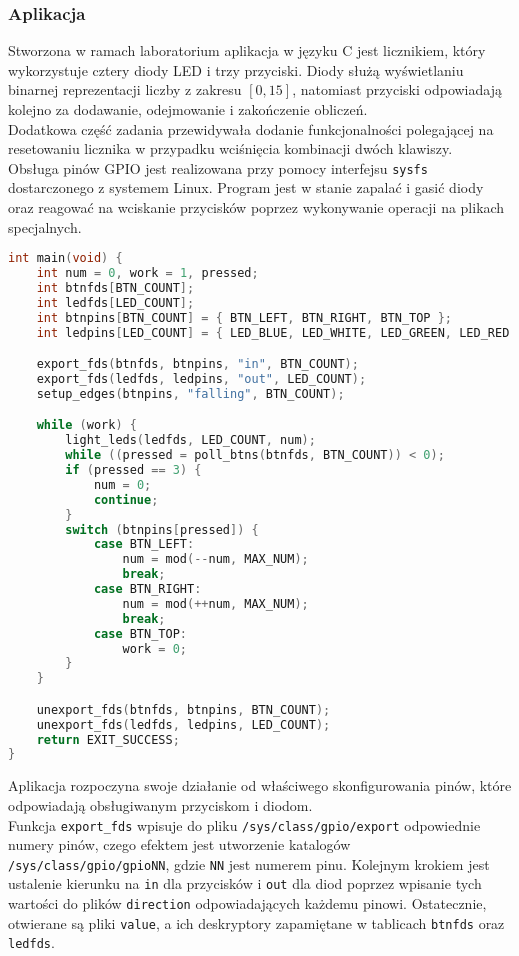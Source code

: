 \documentclass[10pt,a4paper]{article}
\begin{document}
\subsubsection{Aplikacja}
Stworzona w ramach laboratorium aplikacja w języku C jest licznikiem, który wykorzystuje cztery diody LED i trzy przyciski. Diody służą wyświetlaniu binarnej reprezentacji liczby z zakresu $[0,15]$, natomiast przyciski odpowiadają kolejno za dodawanie, odejmowanie i zakończenie obliczeń.\\[\baselineskip]
Dodatkowa część zadania przewidywała dodanie funkcjonalności polegającej na resetowaniu licznika w przypadku wciśnięcia kombinacji dwóch klawiszy.\\[\baselineskip]
Obsługa pinów GPIO jest realizowana przy pomocy interfejsu \texttt{sysfs} dostarczonego z systemem Linux. Program jest w stanie zapalać i gasić diody oraz reagować na wciskanie przycisków poprzez wykonywanie operacji na plikach specjalnych.
\begin{lstlisting}[style=bash, language=c, caption={Funkcja main w pliku counter.c}]
int main(void) {
	int num = 0, work = 1, pressed;
	int btnfds[BTN_COUNT];
	int ledfds[LED_COUNT];
	int btnpins[BTN_COUNT] = { BTN_LEFT, BTN_RIGHT, BTN_TOP };
	int ledpins[LED_COUNT] = { LED_BLUE, LED_WHITE, LED_GREEN, LED_RED };

	export_fds(btnfds, btnpins, "in", BTN_COUNT);
	export_fds(ledfds, ledpins, "out", LED_COUNT);
	setup_edges(btnpins, "falling", BTN_COUNT);

	while (work) {
		light_leds(ledfds, LED_COUNT, num);
		while ((pressed = poll_btns(btnfds, BTN_COUNT)) < 0);
		if (pressed == 3) {
			num = 0;
			continue;
		}
		switch (btnpins[pressed]) {
			case BTN_LEFT:
				num = mod(--num, MAX_NUM);
				break;
			case BTN_RIGHT:
				num = mod(++num, MAX_NUM);
				break;
			case BTN_TOP:
				work = 0;
		}
	}

	unexport_fds(btnfds, btnpins, BTN_COUNT);
	unexport_fds(ledfds, ledpins, LED_COUNT);
	return EXIT_SUCCESS;
}
\end{lstlisting}
Aplikacja rozpoczyna swoje działanie od właściwego skonfigurowania pinów, które odpowiadają obsługiwanym przyciskom i diodom.\\[\baselineskip]
Funkcja \texttt{export\_fds} wpisuje do pliku \texttt{/sys/class/gpio/export} odpowiednie numery pinów, czego efektem jest utworzenie katalogów \texttt{/sys/class/gpio/gpioNN}, gdzie \texttt{NN} jest numerem pinu. Kolejnym krokiem jest ustalenie kierunku na \texttt{in} dla przycisków i \texttt{out} dla diod poprzez wpisanie tych wartości do plików \texttt{direction} odpowiadających każdemu pinowi. Ostatecznie, otwierane są pliki \texttt{value}, a ich deskryptory zapamiętane w tablicach \texttt{btnfds} oraz \texttt{ledfds}.\\[\baselineskip]
\end{document}
